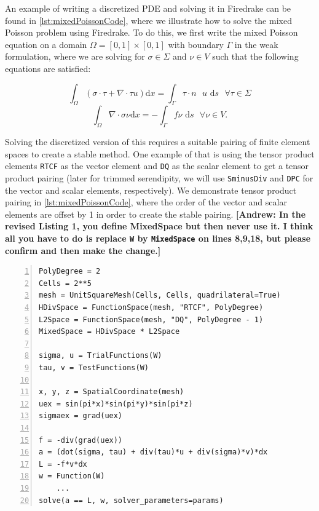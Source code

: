 \documentclass[format=acmsmall,screen,timestamp=false,a4paper]{acmart}
\newcommand\akg[1]{\textbf{\textcolor[rgb]{.5,0,1}{[Andrew: #1]}}}
\begin{document}
An example of writing a discretized PDE and solving it in Firedrake can be found in \cref{lst:mixedPoissonCode}, where we illustrate how to solve the mixed Poisson problem using Firedrake.  To do this, we first write the mixed Poisson equation on a domain $\Omega = [0, 1] \times [0,1]$ with boundary $\Gamma$ in the weak formulation, where we are solving for $\sigma \in \Sigma$ and $\nu \in V$ such that the following equations are satisfied:

\begin{equation*}
    \int_\Omega (\sigma \cdot \tau + \nabla \cdot \tau u) \text{d}x = \int_\Gamma \tau \cdot n \text{ } u \text{ d}s \text{  } \forall \tau \in \Sigma
\end{equation*}
\begin{equation*}
    \int_\Omega  \nabla \cdot \sigma \nu \text{d}x = - \int_\Gamma f \nu \text{ d}s \text{  } \forall \nu \in V.
\end{equation*}
  
\noindent Solving the discretized version of this requires a suitable pairing of finite element spaces to create a stable method.  One example of that is using the tensor product elements \texttt{RTCF} as the vector element and \texttt{DQ} as the scalar element to get a tensor product pairing (later for trimmed serendipity, we will use \texttt{SminusDiv} and \texttt{DPC} for the vector and scalar elements, respectively).  We demonstrate tensor product pairing in \cref{lst:mixedPoissonCode}, where the order of the vector and scalar elements are offset by 1 in order to create the stable pairing. 
\akg{In the revised Listing 1, you define MixedSpace but then never use it.  I think all you have to do is replace \texttt{W} by \texttt{MixedSpace} on lines 8,9,18, but please confirm and then make the change.}
  
\begin{lstlisting}[caption={Basic Firedrake implementation of the mixed Poisson problem showcasing where to choose the elements that are used and how to create the equations in Firedrake's notation.}, label={lst:mixedPoissonCode}, numbers=left, firstnumber=1]
PolyDegree = 2
Cells = 2**5
mesh = UnitSquareMesh(Cells, Cells, quadrilateral=True)
HDivSpace = FunctionSpace(mesh, "RTCF", PolyDegree)
L2Space = FunctionSpace(mesh, "DQ", PolyDegree - 1)
MixedSpace = HDivSpace * L2Space

sigma, u = TrialFunctions(W)
tau, v = TestFunctions(W)

x, y, z = SpatialCoordinate(mesh)
uex = sin(pi*x)*sin(pi*y)*sin(pi*z)
sigmaex = grad(uex)

f = -div(grad(uex))
a = (dot(sigma, tau) + div(tau)*u + div(sigma)*v)*dx
L = -f*v*dx
w = Function(W)
    ...
solve(a == L, w, solver_parameters=params)
\end{lstlisting}
\end{document}
